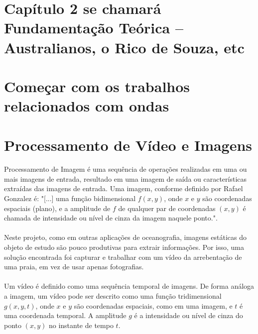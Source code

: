 \section{Capítulo 2 se chamará Fundamentação Teórica – Australianos, o Rico de Souza, etc}

\section{Começar com os trabalhos relacionados com ondas}

\section{Processamento de Vídeo e Imagens}

\paragraph{}Processamento de Imagem é uma sequência de operações realizadas em uma ou mais imagens de entrada, resultado em uma imagem de saída ou características extraídas das imagens de entrada. Uma imagem, conforme definido por Rafael Gonzalez\cite{Gonzalez92} é: "[...] uma função bidimensional \(f(x,y)\), onde \(x\) e \(y\) são coordenadas espaciais (plano), e a amplitude de \(f\) de qualquer par de coordenadas \((x,y)\) é chamada de intensidade ou nível de cinza da imagem naquele ponto.".

\paragraph{}Neste projeto, como em outras aplicações de oceanografia\cite{Jahne02}, imagens estáticas do objeto de estudo são pouco produtivas para extrair informações. Por isso, uma solução encontrada foi capturar e trabalhar com um vídeo da arrebentação de uma praia, em vez de usar apenas fotografias. 

\paragraph{}Um vídeo é definido como uma sequência temporal de imagens. De forma análoga a imagem, um vídeo pode ser descrito como uma função tridimensional \(g(x,y,t)\), onde \(x\) e \(y\) são coordenadas espaciais, como em uma imagem, e \(t\) é uma coordenada temporal. A amplitude \(g\) é a intensidade ou nível de cinza do ponto \((x,y)\) no instante de tempo \(t\).


